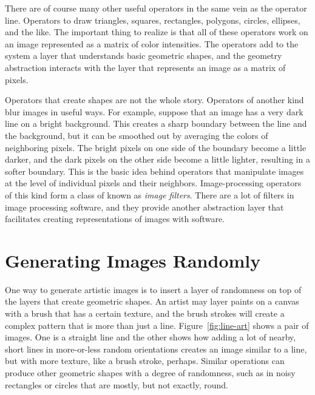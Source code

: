 There are of course many other useful operators in
the same vein as the operator \textsf{line}. Operators to draw
triangles, squares, rectangles, polygons, circles,
ellipses, and the like. The important thing to realize is that all of
these operators work on an image represented as a matrix of
color intensities.
The operators add to the system a layer that understands
basic geometric shapes, and the geometry abstraction 
interacts with the layer that represents an image as a matrix of pixels.

Operators that create shapes are not the whole story.
Operators of another kind blur images in useful ways.
For example, suppose that an image has a
very dark line on a bright background. This creates a
sharp boundary between the line and the background, but it can be
smoothed out by averaging the colors of neighboring pixels.
The bright pixels on one side of the boundary become a little darker,
and the dark pixels on the other side become a little lighter,
resulting in a softer boundary. This is the basic idea behind
operators that manipulate images at the level
of individual pixels and their neighbors. Image-processing operators
of this kind form a class of  known as \emph{image filters}.
There are a lot of filters in image
processing software, and they provide another abstraction layer
that facilitates creating representations of images with software.

\section{Generating Images Randomly}

One way to generate artistic images is to insert a layer of
randomness on top of the layers that create geometric shapes.
An artist may layer paints on a canvas
with a brush that has a certain texture, and the brush strokes
will create a complex pattern that is more than just a line.
Figure~\ref{fig:line-art} shows a pair of images.
One is a straight line
and the other shows how adding a lot of nearby, short lines in
more-or-less random orientations
creates an image similar to a line, but with more texture,
like a brush stroke, perhaps.
Similar operations can produce
other geometric shapes with a degree of randomness,
such as in noisy rectangles or circles that are
mostly, but not exactly, round.


